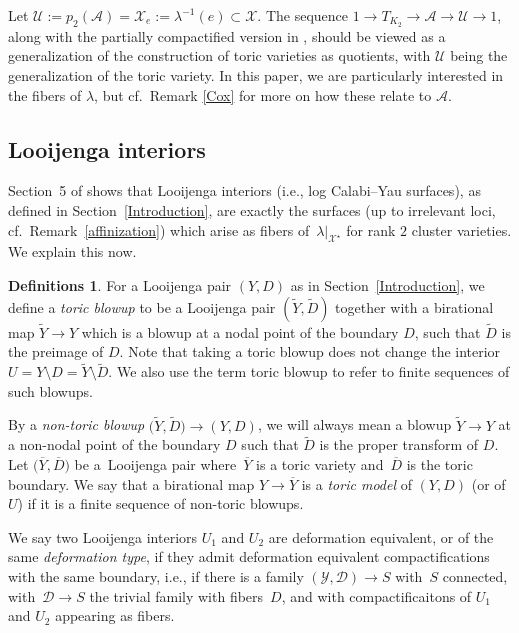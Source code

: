 \documentclass[10pt,a4paper]{amsart}
\numberwithin{equation}{section}
\numberwithin{figure}{section}
\numberwithin{table}{section}
\let\?=\overline
\let\rar=\rightarrow
\let\s=\mathcal
\let\wt=\widetilde
\theoremstyle{definition}
\newtheorem{dfns}[thm]{Definitions}
\begin{document}
Let $\s{U}:=p_2(\s{A})=\s{X}_e:=\lambda^{-1}(e)\subset \s{X}$. The sequence $1\rar T_{K_2} \rar \s{A} \rar \s{U} \rar 1$, along with the partially compactified version in \cite[Section~2]{ManCox}, should be viewed as a generalization of the construction of toric varieties as quotients, with $\s{U}$ being the generalization of the toric variety.
 In this paper, we are particularly interested in the fibers of $\lambda$, but cf.\ Remark \ref{Cox} for more on how these relate to $\s{A}$.

\subsection{Looijenga interiors}\label{Looijenga seeds}

Section~5 of \cite{GHK3} shows that Looijenga interiors (i.e., log Calabi--Yau surfaces), as defined in Section~\ref{Introduction}, are exactly the surfaces (up to irrelevant loci, cf.\ Remark~\ref{affinization}) which arise as fibers of~$\lambda|_{\s{X}^{\star}}$ for rank $2$ cluster varieties. We explain this now.

\begin{dfns}
For a Looijenga pair $(Y,D)$ as in Section~\ref{Introduction}, we define a {\it toric blowup} to be a Looijenga pair $(\wt{Y},\wt{D})$ together with a birational map $\wt{Y}\rar Y$ which is a blowup at a nodal point of the boundary $D$, such that $\wt{D}$ is the preimage of $D$. Note that taking a toric blowup does not change the interior $U = Y\setminus D = \wt{Y}\setminus \wt{D}$. We also use the term toric blowup to refer to finite sequences of such blowups.

By a {\it non-toric blowup} $\big(\wt{Y},\wt{D}\big)\rar (Y,D)$, we will always mean a blowup $\wt{Y}\rar Y$ at a non-nodal point of the boundary $D$ such that $\wt{D}$ is the proper transform of $D$. Let $\big(\?{Y},\?{D}\big)$ be a~Looijenga pair where~$\?{Y}$ is a toric variety and~$\?{D}$ is the toric boundary. We say that a birational map $Y \rar \?{Y}$ is a {\it toric model} of $(Y,D)$ (or of $U$) if it is a finite sequence of non-toric blowups.

We say two Looijenga interiors $U_1$ and $U_2$ are deformation equivalent, or of the same \textit{deformation type}, if they admit deformation equivalent compactifications with the same boundary, i.e., if there is a family $(\s{Y},\s{D}) \rar S$ with~$S$ connected, with~$\s{D}\rar S$ the trivial family with fibers~$D$, and with compactificaitons of $U_1$ and $U_2$ appearing as fibers.
\end{dfns}
\end{document}
